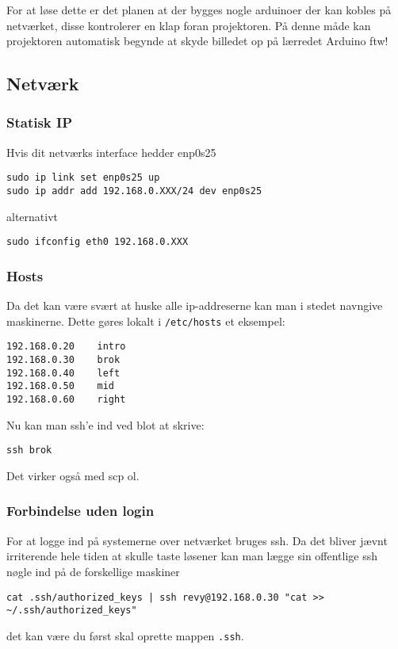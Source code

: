 \documentclass[10pt,a4paper,danish]{article}
\begin{document}
For at løse dette er det planen at der bygges nogle arduinoer der kan kobles på netværket, disse
kontrolerer en klap foran projektoren. På denne måde kan projektoren automatisk
begynde at skyde billedet op på lærredet
Arduino ftw!

\subsection{Netværk}
\subsubsection{Statisk IP}
Hvis dit netværks interface hedder enp0s25
\begin{verbatim}
sudo ip link set enp0s25 up
sudo ip addr add 192.168.0.XXX/24 dev enp0s25
\end{verbatim}

alternativt
\begin{verbatim}
sudo ifconfig eth0 192.168.0.XXX
\end{verbatim}

\subsubsection{Hosts}
Da det kan være svært at huske alle ip-addreserne kan man i stedet navngive
maskinerne.
Dette gøres lokalt i \texttt{/etc/hosts}
et eksempel:

\begin{verbatim}
192.168.0.20    intro
192.168.0.30    brok
192.168.0.40    left
192.168.0.50    mid
192.168.0.60    right
\end{verbatim}

Nu kan man ssh'e ind ved blot at skrive:

\begin{verbatim}
ssh brok
\end{verbatim}

Det virker også med scp ol.

\subsubsection{Forbindelse uden login}
For at logge ind på systemerne over netværket bruges ssh.
Da det bliver jævnt irriterende hele tiden at skulle taste løsener kan man lægge
sin offentlige ssh nøgle ind på de forskellige maskiner
\begin{verbatim}
cat .ssh/authorized_keys | ssh revy@192.168.0.30 "cat >> ~/.ssh/authorized_keys"
\end{verbatim}
det kan være du først skal oprette mappen \texttt{.ssh}.
\end{document}
